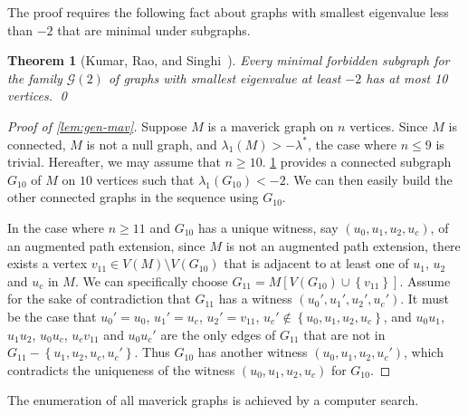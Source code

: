 \documentclass[11pt]{article}
\newtheorem{theorem}{Theorem}[section]
\theoremstyle{definition}
\theoremstyle{remark}
\newcommand{\sset}[1]{\left\{{#1}\right\}}
\newcommand{\la}{\lambda}
\newcommand{\las}{\lambda^*}
\newcommand{\G}{\mathcal{G}}
\begin{document}
The proof requires the following fact about graphs with smallest eigenvalue less than $-2$ that are minimal under subgraphs.

\begin{theorem}[Kumar, Rao, and Singhi~\cite{KRS82}] \label{thm:min-forb-10}
    Every minimal forbidden subgraph for the family $\G(2)$ of graphs with smallest eigenvalue at least $-2$ has at most 10 vertices. \qed
\end{theorem}

\begin{proof}[Proof of \cref{lem:gen-mav}]
    Suppose $M$ is a maverick graph on $n$ vertices. Since $M$ is connected, $M$ is not a null graph, and $\la_1(M) > -\las$, the case where $n \le 9$ is trivial. Hereafter, we may assume that $n \ge 10$. \cref{thm:min-forb-10} provides a connected subgraph $G_{10}$ of $M$ on $10$ vertices such that $\la_1(G_{10}) < -2$. We can then easily build the other connected graphs in the sequence using $G_{10}$.

    In the case where $n \ge 11$ and $G_{10}$ has a unique witness, say $(u_0,u_1,u_2,u_c)$, of an augmented path extension, since $M$ is not an augmented path extension, there exists a vertex $v_{11} \in V(M) \setminus V(G_{10})$ that is adjacent to at least one of $u_1$, $u_2$ and $u_c$ in $M$. We can specifically choose $G_{11} = M[V(G_{10}) \cup \sset{v_{11}}]$. Assume for the sake of contradiction that $G_{11}$ has a witness $(u_0',u_1',u_2',u_c')$. It must be the case that $u_0'=u_0$, $u_1'=u_c$, $u_2'=v_{11}$, $u_c' \not\in \sset{u_0,u_1,u_2,u_c}$, and $u_0u_1$, $u_1u_2$, $u_0u_c$, $u_cv_{11}$ and $u_0u_c'$ are the only edges of $G_{11}$ that are not in $G_{11} - \sset{u_1, u_2, u_c, u_c'}$. Thus $G_{10}$ has another witness $(u_0,u_1,u_2,u_c')$, which contradicts the uniqueness of the witness $(u_0,u_1,u_2,u_c)$ for $G_{10}$.
\end{proof}

The enumeration of all maverick graphs is achieved by a computer search.
\end{document}
